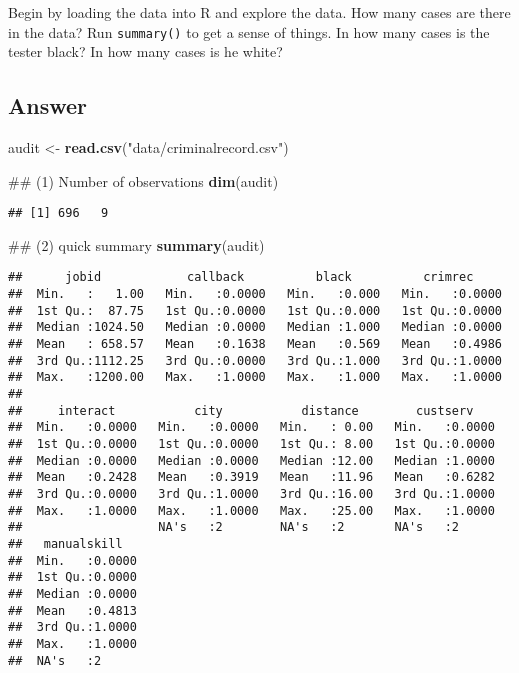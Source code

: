 \documentclass[]{article}
\newenvironment{Shaded}{\begin{snugshade}}{\end{snugshade}}
\newcommand{\KeywordTok}[1]{\textcolor[rgb]{0.13,0.29,0.53}{\textbf{{#1}}}}
\newcommand{\StringTok}[1]{\textcolor[rgb]{0.31,0.60,0.02}{{#1}}}
\newcommand{\NormalTok}[1]{{#1}}
\begin{document}
Begin by loading the data into R and explore the data. How many cases
are there in the data? Run \texttt{summary()} to get a sense of things.
In how many cases is the tester black? In how many cases is he white?

\subsection{Answer}\label{answer}

\begin{Shaded}
\begin{Highlighting}[]
\NormalTok{audit <-}\StringTok{ }\KeywordTok{read.csv}\NormalTok{(}\StringTok{"data/criminalrecord.csv"}\NormalTok{)}

\NormalTok{## (1) Number of observations}
\KeywordTok{dim}\NormalTok{(audit)}
\end{Highlighting}
\end{Shaded}

\begin{verbatim}
## [1] 696   9
\end{verbatim}

\begin{Shaded}
\begin{Highlighting}[]
\NormalTok{## (2) quick summary}
\KeywordTok{summary}\NormalTok{(audit)}
\end{Highlighting}
\end{Shaded}

\begin{verbatim}
##      jobid            callback          black          crimrec      
##  Min.   :   1.00   Min.   :0.0000   Min.   :0.000   Min.   :0.0000  
##  1st Qu.:  87.75   1st Qu.:0.0000   1st Qu.:0.000   1st Qu.:0.0000  
##  Median :1024.50   Median :0.0000   Median :1.000   Median :0.0000  
##  Mean   : 658.57   Mean   :0.1638   Mean   :0.569   Mean   :0.4986  
##  3rd Qu.:1112.25   3rd Qu.:0.0000   3rd Qu.:1.000   3rd Qu.:1.0000  
##  Max.   :1200.00   Max.   :1.0000   Max.   :1.000   Max.   :1.0000  
##                                                                     
##     interact           city           distance        custserv     
##  Min.   :0.0000   Min.   :0.0000   Min.   : 0.00   Min.   :0.0000  
##  1st Qu.:0.0000   1st Qu.:0.0000   1st Qu.: 8.00   1st Qu.:0.0000  
##  Median :0.0000   Median :0.0000   Median :12.00   Median :1.0000  
##  Mean   :0.2428   Mean   :0.3919   Mean   :11.96   Mean   :0.6282  
##  3rd Qu.:0.0000   3rd Qu.:1.0000   3rd Qu.:16.00   3rd Qu.:1.0000  
##  Max.   :1.0000   Max.   :1.0000   Max.   :25.00   Max.   :1.0000  
##                   NA's   :2        NA's   :2       NA's   :2       
##   manualskill    
##  Min.   :0.0000  
##  1st Qu.:0.0000  
##  Median :0.0000  
##  Mean   :0.4813  
##  3rd Qu.:1.0000  
##  Max.   :1.0000  
##  NA's   :2
\end{verbatim}
\end{document}
